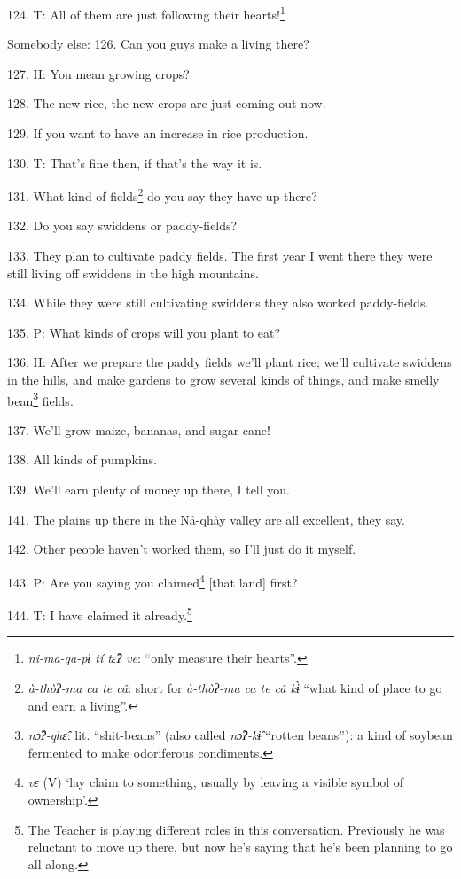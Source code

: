 124. T: All of them are just following their hearts!\footnote{\textit{ni-ma-qa-pɨ tí tɛ̂ʔ ve}: ``only measure their hearts''.}

Somebody else: 126. Can you guys make a living there?

127. H: You mean growing crops?

128. The new rice, the new crops are just coming out now.

129. If you want to have an increase in rice production.

130. T: That's fine then, if that's the way it is.

131. What kind of fields\footnote{\textit{ à-thòʔ-ma ca te câ}: short for \textit{à-thòʔ-ma ca te câ kɨ̀ }``what kind of place to go and earn a living''.} do you say they have up there?

132. Do you say swiddens or paddy-fields?

133. They plan to cultivate paddy fields. The first year I went there they were
still living off swiddens in the high mountains.

134. While they were still cultivating swiddens they also worked paddy-fields.

135. P: What kinds of crops will you plant to eat?

136. H: After we prepare the paddy fields we'll plant rice; we'll cultivate swiddens
in the hills, and make gardens to grow several kinds of things, and make smelly
bean\footnote{\textit{ nɔ̂ʔ-qhɛ̂}: lit. ``shit-beans'' (also called \textit{nɔ̂ʔ-kɨ̂} ``rotten beans''): a kind of soybean fermented to make odoriferous condiments.} fields.

137. We'll grow maize, bananas, and sugar-cane!

138. All kinds of pumpkins.

139. We'll earn plenty of money up there, I tell you.

141. The plains up there in the Nâ-qhày valley are all excellent, they say.

142. Other people haven't worked them, so I'll just do it myself.

143. P: Are you saying you claimed\footnote{\textit{vɛ} (V) `lay claim to something, usually by leaving a visible symbol of ownership'.} [that land] first?

144. T: I have claimed it already.\footnote{The Teacher is playing different roles in this conversation. Previously he was reluctant to move up there, but now he's saying that he's been planning to go all along.}

